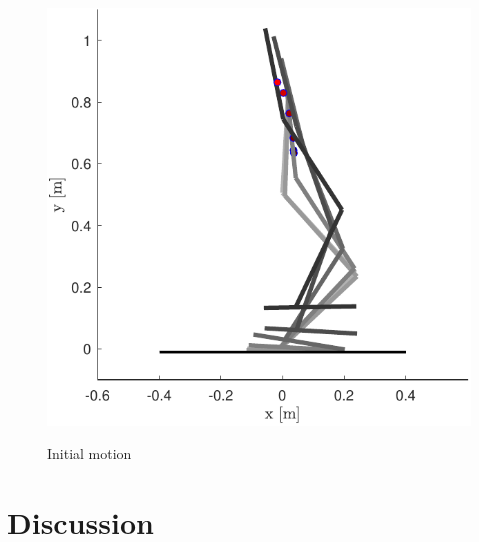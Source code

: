 \documentclass[letterpaper, 10 pt, conference]{ieeeconf}  %
\begin{document}
	\begin{figure}[b]
		\centering
		{\includegraphics[scale=0.5]{initialguess}
		}%
		\caption{Initial motion} \label{fig:seq}	
	\end{figure}
	
	
	
	
	\section{Discussion} \label{sec:discussion}
	
\end{document}
